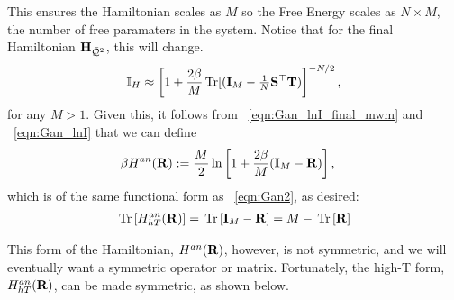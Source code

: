 This ensures the Hamiltonian scales as $M$ so the Free Energy scales as $N \times M$, the
number of free paramaters in the system.
Notice that for the final \LayerQualitySquared Hamiltonian $\mathbf{H}_{\bar{\mathcal{Q}}^{2}}$, this will change.
\begin{align}
  \label{eqn:I_9}
    \mathbb{I}_{H}\approx  \left[1  + \frac{2\beta}{M}\operatorname{Tr}[(\mathbf{I}_{M}-\tfrac{1}{N}{\mathbf{S}}^{\top}{\mathbf{T}})\right]^{-N/2} ,
\end{align}
for any $M>1$.
Given this, it follows from \EQN~\ref{eqn:Gan_lnI_final_mwm} and \EQN~\ref{eqn:Gan_lnI} that we can define 
\begin{align}
\label{eqn:GANmat}
\beta H^{an}(\mathbf{R}) 
  &:=  \frac{M}{2}\ln \left[1 + \frac{2\beta}{M}(\mathbf{I}_{M}-\mathbf{R})\right]  ,
\end{align}
which is of the same functional form as \EQN~\ref{eqn:Gan2}, as desired:
\begin{align}
\label{eqn:GANHTmatR}
\mbox{}\operatorname{Tr}\left[H^{an}_{hT}(\mathbf{R})\right] = \mbox{}\operatorname{Tr}\left[\mathbf{I}_{M}-\mathbf{R}\right] = M-\mbox{}\operatorname{Tr}\left[\mathbf{R}\right]
\end{align}




This form of the Hamiltonian, $H^{an}(\mathbf{R})$, however, is not symmetric, and we will
eventually want a symmetric operator or matrix.
Fortunately, the high-T form, $H^{an}_{hT}(\mathbf{R})$, can be made symmetric, as
shown below.
